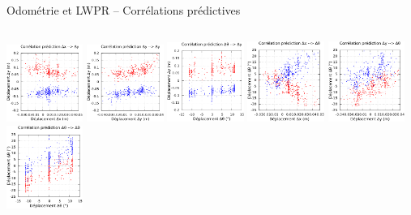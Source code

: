 \begin{frame}[noframenumbering]{Odométrie et LWPR -- Corrélations prédictives}
\begin{columns}
\begin{column}{0.65\linewidth}
            \newline
            \includegraphics[type=pdf,ext=.pdf,read=.pdf,width=2.5cm]{../plot/OdometryLWPR/grass_close_function_goal_x_y}
            \includegraphics[type=pdf,ext=.pdf,read=.pdf,width=2.5cm]{../plot/OdometryLWPR/grass_close_function_goal_y_y}
            \includegraphics[type=pdf,ext=.pdf,read=.pdf,width=2.5cm]{../plot/OdometryLWPR/grass_close_function_goal_yaw_y}
            \vspace{0.2cm}
            \newline
            \includegraphics[type=pdf,ext=.pdf,read=.pdf,width=2.5cm]{../plot/OdometryLWPR/grass_close_function_goal_x_yaw}
            \includegraphics[type=pdf,ext=.pdf,read=.pdf,width=2.5cm]{../plot/OdometryLWPR/grass_close_function_goal_y_yaw}
            \includegraphics[type=pdf,ext=.pdf,read=.pdf,width=2.5cm]{../plot/OdometryLWPR/grass_close_function_goal_yaw_yaw}
        \end{column}
    \end{columns}
\end{frame}

